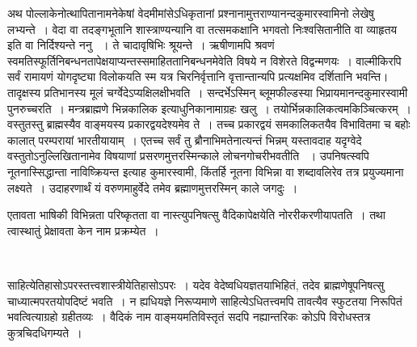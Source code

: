 अथ पोल्लाकेनोत्थापितानामनेकेषां वेदमीमांसेऽधिकृतानां प्रश्नानामुत्तराण्यानन्दकुमारस्वामिनो  लेखेषु लभ्यन्ते~। वेदा वा तदङ्गभूतानि शास्त्राण्यन्यानि वा तत्समकक्षानि भगवतो निःश्वसितानीति वा व्याहृतय इति वा निर्दिश्यन्ते ननु ~। ते चादावृषिभिः श्रूयन्ते~। ऋषीणामपि श्रवणं स्वमतिस्फूर्तिनिबन्धनतापेक्षयाप्यन्तस्समाहिततानिबन्धनमेवेति विषये न विशेरते विद्वन्मणयः~। वाल्मीकिरपि सर्वं रामायणं योगदृष्ट्या विलोकयति स्म यत्र चिरनिर्वृत्तानि वृत्तान्तान्यपि प्रत्यक्षमिव दर्शितानि भवन्ति। तादृक्षस्य प्रतिभानस्य मूलं चर्ग्वेदेऽप्यक्षिलक्षीभवति~। सन्दर्भेऽस्मिन् ब्लूमफील्डस्या भिप्रायमानन्दकुमारस्वामी पुनरुच्चरति~। मन्त्रब्राह्मणे भिन्नकालिक इत्याधुनिकानामाग्रहः खलु~। तयोर्भिन्नकालिकत्वमकिञ्चित्करम्~। वस्तुतस्तु ब्राह्मस्यैव वाङ्मयस्य प्रकारद्वयदेश्यमेव ते~। तच्च प्रकारद्वयं समकालिकतयैव विभावितमा च बहोः कालात् परम्परायां भारतीयायाम्~। एतच्च सर्वं तु ब्रौनाभिमतेनात्यन्तं भिन्नम्  यस्तावदाह यदृग्वेदे वस्तुतोऽनुल्लिखितानामेव विषयाणां प्रसरणमुत्तरस्मिन्काले लोचनगोचरीभवतीति ~। उपनिषत्स्वपि नूतनास्सिद्धान्ता नाविष्क्रियन्त इत्याह कुमारस्वामी, किंतर्हि नूतना विभिन्ना वा शब्दावलिरेव तत्र प्रयुज्यमाना लक्ष्यते~। उदाहरणार्थं यं वरुणमाहुर्वेदे तमेव ब्रह्माणमुत्तरस्मिन् काले जगदुः~।

एतावता भाषिकी विभिन्नता परिष्कृतता वा नास्त्युपनिषत्सु वैदिकापेक्षयेति नोररीकरणीयापतति~। तथा त्वास्थातुं प्रेक्षावता केन नाम प्रक्रम्येत~।

\begin{myquote}

~\hfill {}
\end{myquote}

साहित्येतिहासोऽपरस्तत्त्वशास्त्रीयेतिहासोऽपरः~। यदेव वेदेष्वधियज्ञतयाभिहितं, तदेव ब्राह्मणेषूपनिषत्सु चाध्यात्मपरतयोपदिष्टं भवति~। न ह्यधियज्ञे निरूप्यमाणे साहित्येऽधितत्त्वमपि तावत्यैव स्फुटतया निरूपितं भवत्वित्याग्रहो ग्रहीतव्यः~। वैदिकं नाम वाङ्मयमतिविस्तृतं सदपि नह्यान्तरिकः कोऽपि विरोधस्तत्र कुत्रचिदधिगम्यते~।



